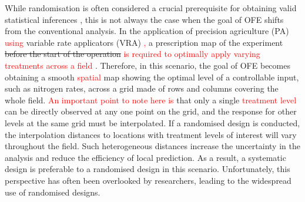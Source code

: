 \documentclass[a4paper]{article} 	%
\newcommand{\revision}[1]{\textcolor{red}{#1}}
\begin{document}
While randomisation is often considered a crucial prerequisite for obtaining valid statistical inferences \parencite{Piepho2013Why}, this is not always the case when the goal of OFE shifts from the conventional analysis. In the application of precision agriculture (PA) \revision{using} variable rate applicators (VRA) \revision{,} a prescription map of the experiment \st{before the start of the operation} \revision{is required to optimally apply varying treatments across a field} \parencite{Pringle2004FieldScale}. Therefore, in this scenario, the goal of OFE becomes obtaining a smooth \revision{spatial} map showing the optimal level of a controllable input, such as nitrogen rates, across a grid made of rows and columns covering the whole field. \revision{An important point to note here is} that only a single \revision{treatment level} can be directly observed at any one point on the grid, and the response for other levels at the same grid must be interpolated. If a randomised design is conducted, the interpolation distances to locations with treatment levels of interest will vary throughout the field. Such heterogeneous distances increase the uncertainty in the analysis and reduce the efficiency of local prediction. As a result, a systematic design is preferable to a randomised design in this scenario. Unfortunately, this perspective has often been overlooked by researchers, leading to the widespread use of randomised designs.
\end{document}

